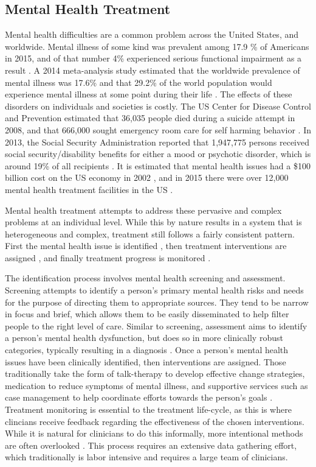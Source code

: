 \documentclass[sigconf]{acmart}
\begin{document}
\subsection{Mental Health Treatment}
Mental health difficulties are a common problem across the United States, and worldwide. Mental illness of some kind was prevalent among 17.9 \% of Americans in 2015, and of that number 4\% experienced serious functional impairment as a result \cite{nihmstats}. A 2014 meta-analysis study estimated that the worldwide prevalence of mental illness was 17.6\% and that 29.2\% of the world population would experience mental illness at some point during their life \cite{worldprev}. The effects of these disorders on individuals and societies is costly. The US Center for Disease Control and Prevention estimated that 36,035 people died during a suicide attempt in 2008, and that 666,000 sought emergency room care for self harming behavior \cite{cdcsuicide}. In 2013, the Social Security Administration reported that 1,947,775 persons received social security/disability benefits for either a mood or psychotic disorder, which is around 19\% of all recipients \cite{ssarecipients}. It is estimated that mental health issues had a \$100 billion cost on the US economy in 2002 \cite{nihmstats}, and in 2015 there were over 12,000 mental health treatment facilities in the US \cite{n-mhss2015}.

Mental health treatment attempts to address these pervasive and complex problems at an individual level. While this by nature results in a system that is heterogeneous and complex, treatment still follows a fairly consistent pattern. First the mental health issue is identified \cite{apapractscreeassess}, then treatment interventions are assigned \cite{samhsatx}, and finally treatment progress is monitored \cite{progressmonitoring}.

The identification process involves mental health screening and assessment. Screening attempts to identify a person's primary mental health risks and needs for the purpose of directing them to appropriate sources. They tend to be narrow in focus and brief, which allows them to be easily disseminated to help filter people to the right level of care. Similar to screening, assessment aims to identify a person's mental health dysfunction, but does so in more clinically robust categories, typically resulting in a diagnosis \cite{apapractscreeassess}. 
Once a person's mental health issues have been clinically identified, then interventions are assigned. Those traditionally take the form of talk-therapy to develop effective change strategies, medication to reduce symptoms of mental illness, and supportive services such as case management to help coordinate efforts towards the person's goals \cite{samhsatx}.
Treatment monitoring is essential to the treatment life-cycle, as this is where clincians receive feedback regarding the effectiveness of the chosen interventions. While it is natural for clinicians to do this informally, more intentional methods are often overlooked \cite{progressmonitoring}.
This process requires an extensive data gathering effort, which traditionally is labor intensive and requires a large team of clinicians.
\end{document}
